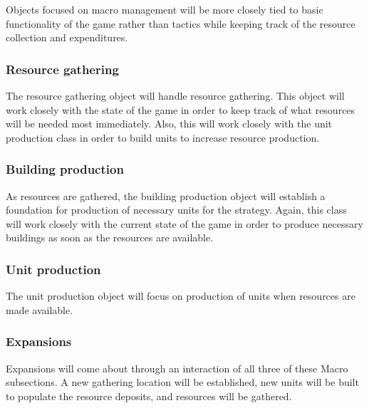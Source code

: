 Objects focused on macro management will be more closely tied to basic functionality of the game rather than tactics while keeping track of the resource collection and expenditures.

\subsubsection{Resource gathering}
The resource gathering object will handle resource gathering. This object will work closely with the state of the game in order to keep track of what resources will be needed most immediately. Also, this will work closely with the unit production class in order to build units to increase resource production.

\subsubsection{Building production}
As resources are gathered, the building production object will establish a foundation for production of necessary units for the strategy. Again, this class will work closely with the current state of the game in order to produce necessary buildings as soon as the resources are available.

\subsubsection{Unit production}
The unit production object will focus on production of units when resources are made available. 

\subsubsection{Expansions}
Expansions will come about through an interaction of all three of these Macro subsections. A new gathering location will be established, new units will be built to populate the resource deposits, and resources will be gathered.